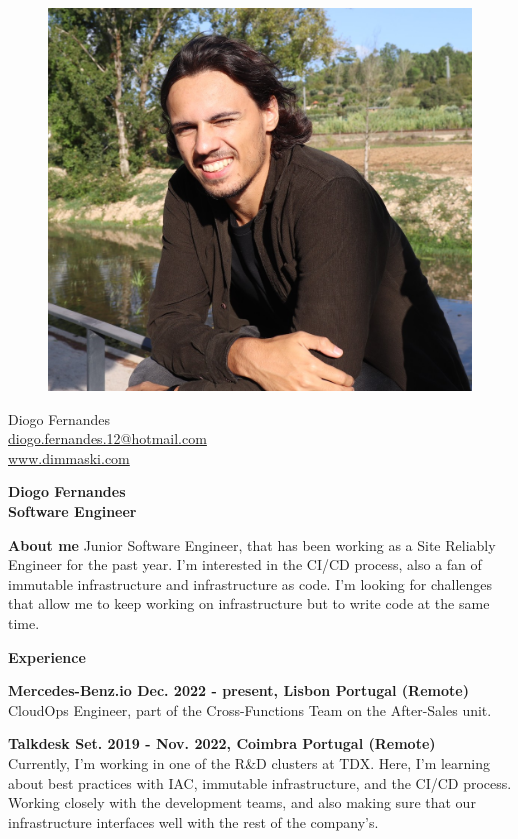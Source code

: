 \documentclass[a4paper,12pt,final]{memoir}
\newcommand{\Sep}{\vspace{1.5em}}
\newcommand{\SmallSep}{\vspace{0.5em}}
\newenvironment{AboutMe}
	{\ignorespaces\textbf{\color{RoyalBlue} About me}}
	{\Sep\ignorespacesafterend}
\newcommand{\CVSection}[1]
	{\Large\textbf{#1}\par
	\SmallSep\normalsize\normalfont}
\newcommand{\CVItem}[1]
	{\textbf{\color{RoyalBlue} #1}}
\begin{document}
%
\begin{figure}
	\hfill
	\includegraphics[width=0.6\columnwidth]{cv-photo.jpg}
	\vspace{-7cm}
\end{figure}

\begin{flushright}\small
	Diogo Fernandes \\
	\url{diogo.fernandes.12@hotmail.com}  \\
	\url{www.dimmaski.com} \\
\end{flushright}\normalsize
\framebreak


\Huge\bfseries {\color{RoyalBlue} Diogo Fernandes} \\
\Large\bfseries  Software Engineer \\

\normalsize\normalfont

\begin{AboutMe}
Junior Software Engineer, that has been working as a Site Reliably Engineer for the past year. I'm interested in the CI/CD process, also a fan of immutable infrastructure and infrastructure as code. I'm looking for challenges that allow me to keep working on infrastructure but to write code at the same time.
\end{AboutMe}

\CVSection{Experience}
\CVItem{Mercedes-Benz.io Dec. 2022 - present, Lisbon Portugal (Remote)}\\
CloudOps Engineer, part of the Cross-Functions Team on the After-Sales unit.
\SmallSep

\CVItem{Talkdesk Set. 2019 - Nov. 2022, Coimbra Portugal (Remote)}\\
Currently, I'm working in one of the R\&D clusters at TDX. Here, I'm learning about best practices with IAC, immutable infrastructure, and the CI/CD process. Working closely with the development teams, and also making sure that our infrastructure interfaces well with the rest of the company's.
\SmallSep
\end{document}
